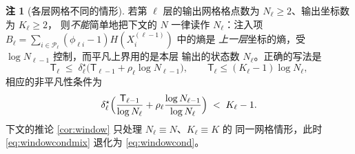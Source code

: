 \documentclass[a4paper,11pt]{article}
\theoremstyle{definition}
\newtheorem{remark}{注}
\newcommand{\1}{\mathbf 1}
\newcommand{\Pset}{\mathcal P}
\newcommand{\TCs}{\mathsf T}
\begin{document}
\begin{remark}[各层网格不同的情形]
\label{rem:perlayerN}
若第 $\ell$ 层的输出网格格点数为 $N_\ell\ge2$、输出坐标数为 $K_\ell\ge2$，
则\emph{不能}简单地把下文的 $N$ 一律读作 $N_\ell$：注入项
$B_\ell=\sum_{i\in\Pset_\ell}(\phi_{\ell i}-1)H(X_i^{(\ell-1)})$ 中的熵是
\emph{上一层}坐标的熵，受 $\log N_{\ell-1}$ 控制，而平凡上界用的是本层
输出的状态数 $N_\ell$。正确的写法是
\begin{equation}
\label{eq:windowrecmix}
\TCs_\ell\;\le\;\delta^\star_\ell\bigl(\TCs_{\ell-1}+\rho_\ell\log N_{\ell-1}\bigr),
\qquad
\TCs_\ell\le(K_\ell-1)\log N_\ell ,
\end{equation}
相应的非平凡性条件为
\begin{equation}
\label{eq:windowcondmix}
\delta^\star_\ell
\Bigl(\frac{\TCs_{\ell-1}}{\log N_\ell}
+\rho_\ell\frac{\log N_{\ell-1}}{\log N_\ell}\Bigr)
\;<\;K_\ell-1 .
\end{equation}
下文的推论 \ref{cor:window} 只处理 $N_\ell\equiv N$、$K_\ell\equiv K$ 的
同一网格情形，此时 \eqref{eq:windowcondmix} 退化为 \eqref{eq:windowcond}。
\end{remark}
\end{document}
